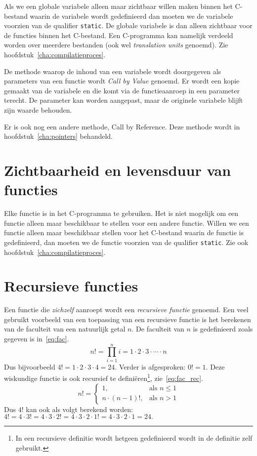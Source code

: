 Als we een globale variabele alleen maar zichtbaar willen maken binnen het C-bestand waarin de variabele wordt gedefinieerd dan moeten we de variabele voorzien van de qualifier \texttt{static}.
De globale variabele is dan alleen zichtbaar voor de functies binnen het C-bestand. Een C-programma kan namelijk verdeeld worden over meerdere bestanden (ook wel \textsl{translation units} genoemd). Zie hoofdstuk~\ref{cha:compilatieproces}.


\begin{infobox}
De methode waarop de inhoud van een variabele wordt doorgegeven als parameters van een functie wordt \textsl{Call by Value} genoemd. Er wordt een kopie gemaakt van de variabele en die komt via de functieaanroep in een parameter terecht. De parameter kan worden aangepast, maar de originele variabele blijft zijn waarde behouden.

Er is ook nog een andere methode, Call by Reference. Deze methode wordt in hoofdstuk~\ref{cha:pointers} behandeld.
\end{infobox}

\section{Zichtbaarheid en levensduur van functies}
Elke functie is in het C-programma te gebruiken. Het is niet mogelijk om een functie alleen maar beschikbaar te stellen voor een andere functie. Willen we een functie alleen maar beschikbaar stellen voor het C-bestand waarin de functie is gedefinieerd, dan moeten we de functie voorzien van de qualifier \texttt{static}. Zie ook hoofdstuk~\ref{cha:compilatieproces}.


\section{Recursieve functies}
Een functie die \textsl{zichzelf} aanroept wordt een \textsl{recursieve functie} genoemd.
Een veel gebruikt voorbeeld van een toepassing van een recursieve functie is het berekenen van de faculteit van een natuurlijk getal $n$.
De faculteit van $n$ is gedefinieerd zoals gegeven is in~\eqref{eq:fac}.
\begin{equation}
\label{eq:fac}
	n! = \prod_{i=1}^{n} i = 1 \cdot{} 2 \cdot{} 3 \cdot{} \cdots{} \cdot{} n
\end{equation} 
Dus bijvoorbeeld $4! = 1 \cdot{} 2 \cdot{} 3 \cdot 4 = 24$.
Verder is afgesproken: $0! = 1$.
Deze wiskundige functie is ook recursief te definiëren\footnote{%
	In een recursieve definitie wordt hetgeen gedefinieerd wordt in de definitie zelf gebruikt.
}, zie~\eqref{eq:fac_rec}.
\begin{equation}
\label{eq:fac_rec}
	n! =
	\begin{cases}
		1, & \text{als $n \leq 1$}\\
		n \cdot{} (n - 1)!, & \text{als $n > 1$}
	\end{cases}
\end{equation} 
Dus $4!$ kan ook als volgt berekend worden: $4! = 4 \cdot{} 3! = 4 \cdot{} 3 \cdot{} 2! = 4 \cdot{} 3 \cdot{} 2 \cdot 1! = 4 \cdot{} 3 \cdot{} 2 \cdot 1 = 24.$

